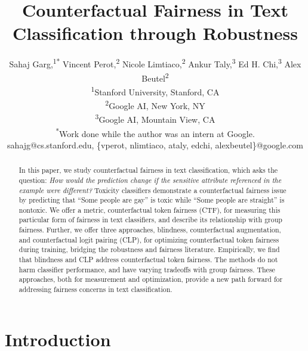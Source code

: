 \documentclass[letterpaper]{article} %
\theoremstyle{definition}
\begin{document}
 
%
\title{Counterfactual Fairness in Text Classification through Robustness}

 \author{Sahaj Garg,\textsuperscript{1}\textsuperscript{*}
Vincent Perot,\textsuperscript{2}
Nicole Limtiaco,\textsuperscript{2}
Ankur Taly,\textsuperscript{3}
Ed H. Chi,\textsuperscript{3}
Alex Beutel\textsuperscript{2}
\\
\textsuperscript{1}{Stanford University, Stanford, CA}\\
\textsuperscript{2}{Google AI, New York, NY}\\
\textsuperscript{3}{Google AI, Mountain View, CA}\\
\textsuperscript{*}{Work done while the author was an intern at Google.}\\
sahajg@cs.stanford.edu, \{vperot, nlimtiaco, ataly, edchi, alexbeutel\}@google.com}



\maketitle

\begin{abstract}
In this paper, we study counterfactual fairness in text classification, which asks the question: \emph{How would the prediction change if the sensitive attribute referenced in the example were different?} Toxicity classifiers demonstrate a counterfactual fairness issue by predicting that ``Some people are gay'' is toxic while ``Some people are straight'' is nontoxic. We offer a metric, counterfactual token fairness (CTF), for measuring this particular form of fairness in text classifiers, and describe its relationship with group fairness. Further, we offer three approaches, blindness, counterfactual augmentation, and counterfactual logit pairing (CLP), for optimizing counterfactual token fairness during training, bridging the robustness and fairness literature. Empirically, we find that blindness and CLP address counterfactual token fairness. The methods do not harm classifier performance, and have varying tradeoffs with group fairness. These approaches, both for measurement and optimization, provide a new path forward for addressing fairness concerns in text classification.
\end{abstract}

\section{Introduction}
\end{document}
